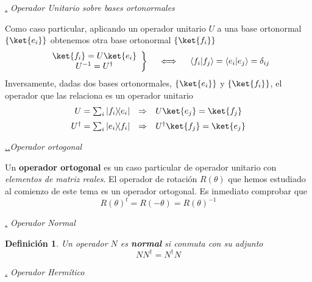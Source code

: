 \documentclass[a4paper,11pt]{book} %
\newtheorem{definicion_contador}{Definición}
\newcommand{\Definicion}[1]{
		\begin{mybox_gray2}{}
			\begin{definicion_contador}
				 #1 
			\end{definicion_contador} 
		\end{mybox_gray2}
	}
\numberwithin{equation}{chapter}
\newcommand{\braket}[2]{\langle #1|#2\rangle}
\newcommand{\ketbra}[2]{| #1\rangle \! \langle #2|}
\def\subsubiContadorIt{\par\addtocounter{subsubsection}{1}\underline{\it\thesubsubsection.}\hskip0.5cm \setcounter{subsubsubsectionIt}{0}}
\newcommand{\SubsubiIt}[1]{
		\subsubiContadorIt \textit{#1}
	}
\newcounter{subsubsubsectionIt}[subsubsection]
\def\subsubiiContadorIt{\par\addtocounter{subsubsubsectionIt}{1}\underline{\it \thesubsubsection.\thesubsubsubsectionIt.}\hskip0.5cm}
\newcommand{\SubsubiiIt}[1]{
		\subsubiiContadorIt \textit{#1}
	}
\begin{document}
			
			
			\SubsubiIt{Operador Unitario sobre bases ortonormales}
			
Como caso particular, aplicando un operador unitario $U$ a una base ortonormal $\{\ket{e_i}\}$ obtenemos otra base ortonormal $\{\ket{f_i}\}$
	\begin{equation}
\left. \begin{array}{c}\ket{f_i} = U\ket{e_i}\\ U^{-1} =  U^\dagger \end{array} \right\}
~~~~ \Longleftrightarrow ~~~~\braket{f_i}{f_j} = \braket{e_i}{e_j} = \delta_{ij}
	\end{equation}
 Inversamente, dadas dos bases ortonormales, $\{\ket{e_i}\}$ y $\{\ket{f_i}\}$, el operador que las relaciona es un operador unitario
 	\begin{equation}
 	 \begin{array}{rcl} 
U = \sum_i \ketbra{f_i}{e_i} & \Rightarrow &  U\ket{e_j} = \ket{f_j} 
 \\ \rule{0mm}{5mm}
U^\dagger = \sum_i \ketbra{e_i}{f_i}  & \Rightarrow &    U^\dagger\ket{f_j} = \ket{e_j} 
 \end{array}
 	\end{equation}


			\SubsubiiIt{Operador ortogonal}
			 
Un  \textbf{operador ortogonal} es un caso particular de operador  unitario con \textit{elementos de matriz reales}. El operador de rotación $R(\theta)$ que hemos estudiado al comienzo de este tema es un operador ortogonal. Es inmediato comprobar que 
\begin{equation} 
R(\theta)^t = R(-\theta) = R(\theta)^{-1}
\end{equation}


			\SubsubiIt{Operador Normal}

\Definicion{
Un operador $N$  es \textbf{normal} si conmuta con su adjunto
\begin{equation}
NN^\dagger = N^\dagger N
\end{equation}
}


			\SubsubiIt{Operador Hermítico}
\end{document}
